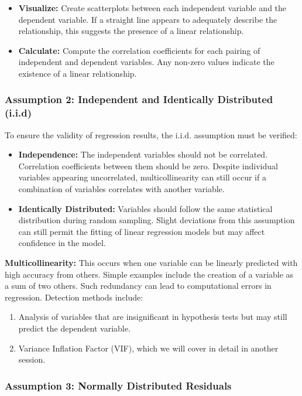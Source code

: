 \documentclass{article}
\theoremstyle{definition}
\theoremstyle{theorem}
\theoremstyle{theorem}
\theoremstyle{theorem}
\theoremstyle{theorem}
\theoremstyle{definition}
\theoremstyle{definition}
\theoremstyle{definition}
\theoremstyle{definition}
\theoremstyle{definition}
\begin{document}
\begin{itemize}
    \item \textbf{Visualize:} Create scatterplots between each independent variable and the dependent variable. If a straight line appears to adequately describe the relationship, this suggests the presence of a linear relationship.
    \item \textbf{Calculate:} Compute the correlation coefficients for each pairing of independent and dependent variables. Any non-zero values indicate the existence of a linear relationship.
\end{itemize}

\subsubsection*{Assumption 2: Independent and Identically Distributed (i.i.d)}

To ensure the validity of regression results, the i.i.d. assumption must be verified:

\begin{itemize}
    \item \textbf{Independence:} The independent variables should not be correlated. Correlation coefficients between them should be zero. Despite individual variables appearing uncorrelated, multicollinearity can still occur if a combination of variables correlates with another variable.
    \item \textbf{Identically Distributed:} Variables should follow the same statistical distribution during random sampling. Slight deviations from this assumption can still permit the fitting of linear regression models but may affect confidence in the model.
\end{itemize}

\textbf{Multicollinearity:} This occurs when one variable can be linearly predicted with high accuracy from others. Simple examples include the creation of a variable as a sum of two others. Such redundancy can lead to computational errors in regression. Detection methods include:
\begin{enumerate}
    \item Analysis of variables that are insignificant in hypothesis tests but may still predict the dependent variable.
    \item Variance Inflation Factor (VIF), which we will cover in detail in another session.
\end{enumerate}

\subsubsection*{Assumption 3: Normally Distributed Residuals}
\end{document}
